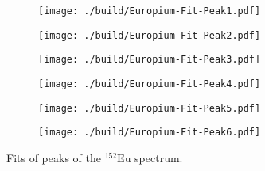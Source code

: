\begin{figure}[H]
	\centering
	\begin{adjustbox}{width=1.3\textwidth, center}
		\begin{subfigure}{.5\textwidth}
			\centering
			\texttt{[image: ./build/Europium-Fit-Peak1.pdf]}
		\end{subfigure}%
		\begin{subfigure}{.5\textwidth}
			\centering
			\texttt{[image: ./build/Europium-Fit-Peak2.pdf]}
		\end{subfigure}
	\end{adjustbox}
	\begin{adjustbox}{width=1.3\textwidth, center}
		\begin{subfigure}{.5\textwidth}
			\centering
			\texttt{[image: ./build/Europium-Fit-Peak3.pdf]}
		\end{subfigure}%
		\begin{subfigure}{.5\textwidth}
			\centering
			\texttt{[image: ./build/Europium-Fit-Peak4.pdf]}
		\end{subfigure}
	\end{adjustbox}
	\begin{adjustbox}{width=1.3\textwidth, center}
		\begin{subfigure}{.5\textwidth}
			\centering
			\texttt{[image: ./build/Europium-Fit-Peak5.pdf]}
		\end{subfigure}%
		\begin{subfigure}{.5\textwidth}
			\centering
			\texttt{[image: ./build/Europium-Fit-Peak6.pdf]}
		\end{subfigure}
	\end{adjustbox}
	\caption{Fits of peaks of the $^{152}\text{Eu}$ spectrum.}
\end{figure}
